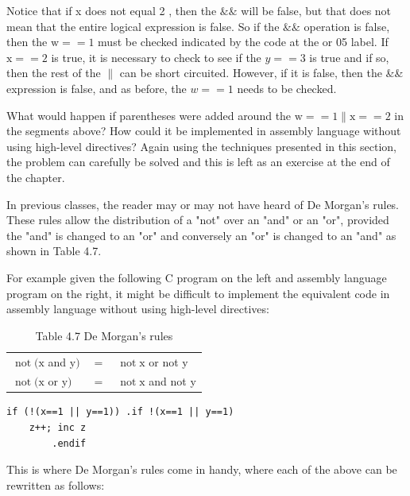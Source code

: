 \documentclass[10pt]{book}
\begin{document}
Notice that if x does not equal 2 , then the $\& \&$ will be false, but that does not mean that the entire logical expression is false. So if the $\& \&$ operation is false, then the $\mathrm{w}==1$ must be checked indicated by the code at the or 05 label. If $\mathrm{x}==2$ is true, it is necessary to check to see if the $y==3$ is true and if so, then the rest of the $\|$ can be short circuited. However, if it is false, then the \&\& expression is false, and as before, the $w==1$ needs to be checked.

What would happen if parentheses were added around the $\mathrm{w}==1 \| \mathrm{x}==2$ in the segments above? How could it be implemented in assembly language without using high-level directives? Again using the techniques presented in this section, the problem can carefully be solved and this is left as an exercise at the end of the chapter.

In previous classes, the reader may or may not have heard of De Morgan's rules. These rules allow the distribution of a "not" over an "and" or an "or", provided the "and" is changed to an "or" and conversely an "or" is changed to an "and" as shown in Table 4.7.

For example given the following C program on the left and assembly language program on the right, it might be difficult to implement the equivalent code in assembly language without using high-level directives:

\begin{table}[htbp]
\begin{center}
\captionsetup{labelformat=empty}
\caption{Table 4.7 De Morgan's rules}
\begin{tabular}{ll|l}
$\operatorname{not}(\mathrm{x}$ and y$)$ & $=$ & $\operatorname{not} \mathrm{x}$ or not y \\

$\operatorname{not}(\mathrm{x}$ or y$)$ & $=$ & $\operatorname{not} \mathrm{x}$ and not y \\
\end{tabular}
\end{center}
\end{table}

\begin{verbatim}
if (!(x==1 || y==1)) .if !(x==1 || y==1)
    z++; inc z
        .endif
\end{verbatim}

This is where De Morgan's rules come in handy, where each of the above can be rewritten as follows:
\end{document}
